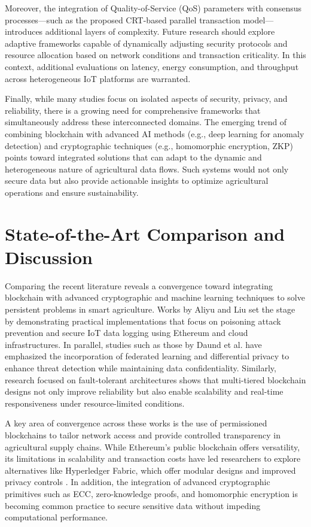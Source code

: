 \documentclass[12pt,onecolumn]{IEEEtran} %
\begin{document}
Moreover, the integration of Quality-of-Service (QoS) parameters with consensus processes—such as the proposed CRT-based parallel transaction model—introduces additional layers of complexity. Future research should explore adaptive frameworks capable of dynamically adjusting security protocols and resource allocation based on network conditions and transaction criticality. In this context, additional evaluations on latency, energy consumption, and throughput across heterogeneous IoT platforms are warranted.

Finally, while many studies focus on isolated aspects of security, privacy, and reliability, there is a growing need for comprehensive frameworks that simultaneously address these interconnected domains. The emerging trend of combining blockchain with advanced AI methods (e.g., deep learning for anomaly detection) and cryptographic techniques (e.g., homomorphic encryption, ZKP) points toward integrated solutions that can adapt to the dynamic and heterogeneous nature of agricultural data flows. Such systems would not only secure data but also provide actionable insights to optimize agricultural operations and ensure sustainability.




\section{State-of-the-Art Comparison and Discussion}\label{sec:soa-discussion}
Comparing the recent literature reveals a convergence toward integrating blockchain with advanced cryptographic and machine learning techniques to solve persistent problems in smart agriculture. Works by Aliyu and Liu set the stage by demonstrating practical implementations that focus on poisoning attack prevention and secure IoT data logging using Ethereum and cloud infrastructures. In parallel, studies such as those by Daund et al. have emphasized the incorporation of federated learning and differential privacy to enhance threat detection while maintaining data confidentiality. Similarly, research focused on fault-tolerant architectures shows that multi-tiered blockchain designs not only improve reliability but also enable scalability and real-time responsiveness under resource-limited conditions.

A key area of convergence across these works is the use of permissioned blockchains to tailor network access and provide controlled transparency in agricultural supply chains. While Ethereum's public blockchain offers versatility, its limitations in scalability and transaction costs have led researchers to explore alternatives like Hyperledger Fabric, which offer modular designs and improved privacy controls \cite{aliyu2023blockchainbasedsmartfarm, soy2025blockchainintegrationin}. In addition, the integration of advanced cryptographic primitives such as ECC, zero-knowledge proofs, and homomorphic encryption is becoming common practice to secure sensitive data without impeding computational performance.
\end{document}
